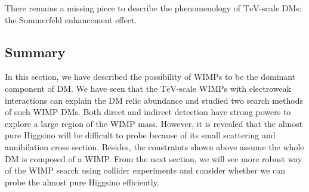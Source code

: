 \documentclass[12pt,twoside,book]{article}
\begin{document}

There remains a missing piece to describe the phenomenology of $\mathrm{TeV}$-scale DMs: the Sommerfeld enhancement effect.



\subsection{Summary}
\label{sec:summary_DM}

In this section, we have described the possibility of WIMPs to be the dominant component of DM.
We have seen that the $\mathrm{TeV}$-scale WIMPs with electroweak interactions can explain the DM relic abundance and studied two search methods of such WIMP DMs.
Both direct and indirect detection have strong powers to explore a large region of the WIMP mass.
However, it is revealed that the almost pure Higgsino will be difficult to probe because of its small scattering and annihilation cross section.
Besides, the constraints shown above assume the whole DM is composed of a WIMP.
From the next section, we will see more robust way of the WIMP search using collider experiments and consider whether we can probe the almost pure Higgsino efficiently.




\end{document}
